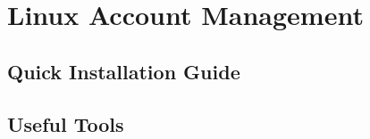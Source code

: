 \chapter{Linux Account Management}


\section{Quick Installation Guide}




\section{Useful Tools}

















